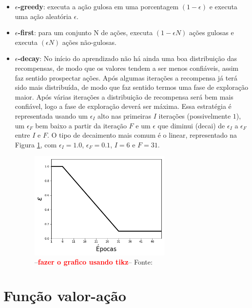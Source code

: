 \documentclass{article}
\newcommand{\todo}[1]{ --\textcolor{red}{\textbf{#1}}--}
\begin{document}
            \begin{itemize}
                \item \textbf{$\epsilon$-greedy}: executa a ação gulosa em uma porcentagem $(1-\epsilon)$ e executa uma ação aleatória $\epsilon$.
                \item \textbf{$\epsilon$-first}: para um conjunto N de ações, executa $(1 - \epsilon N)$ ações gulosas e executa $(\epsilon N)$ ações não-gulosas.
                \item \textbf{$\epsilon$-decay}: No início do aprendizado não há ainda uma boa distribuição das recompensas, de modo que os valores tendem a ser menos confiáveis, assim faz sentido prospectar ações. Após algumas iterações a recompensa já terá sido mais distribuída, de modo que faz sentido termos uma fase de exploração maior. Após várias iterações a distribuição de recompensa será bem mais confiável, logo a fase de exploração deverá ser máxima. Essa estratégia é representada usando um $\epsilon_{I}$ alto nas primeiras $I$ iterações (possivelmente $1$), um $\epsilon_{F}$ bem baixo a partir da iteração $F$ e um $\epsilon$ que diminui (decai) de $\epsilon_{I}$ a $\epsilon_{F}$ entre $I$ e $F$. O tipo de decaimento mais comum é o linear, representado na Figura \ref{fig:epsilon-decay}, com $\epsilon_{I} = 1.0$, $\epsilon_{F} = 0.1$, $I = 6$ e $F = 31$.
                
                \begin{figure}[ht]
                    \centering
                    \includegraphics[width=200pt]{epsilon-decay.png}
                    \caption{\todo{fazer o grafico usando tikz} Fonte:}
                    \label{fig:epsilon-decay}
                \end{figure}
            \end{itemize}
        
\section{Função valor-ação}
\end{document}
